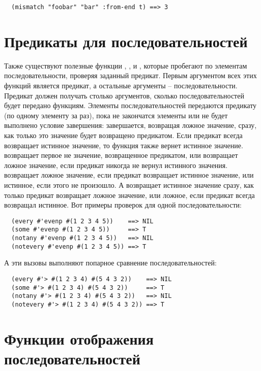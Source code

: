 \begin{verbatim}
  (mismatch "foobar" "bar" :from-end t) ==> 3
\end{verbatim}

\section{Предикаты для последовательностей}

Также существуют полезные функции , ,  и
, которые пробегают по элементам последовательности, проверяя заданный
предикат.  Первым аргументом всех этих функций является предикат, а остальные аргументы --
последовательности.  Предикат должен получать столько аргументов, сколько
последовательностей будет передано функциям.  Элементы последовательностей передаются
предикату (по одному элементу за раз), пока не закончатся элементы или не будет выполнено
условие завершения:  завершается, возвращая ложное значение, сразу, как только это
значение будет возвращено предикатом.  Если предикат всегда возвращает истинное значение,
то функция также вернет истинное значение.   возвращает первое не 
значение, возвращенное предикатом, или возвращает ложное значение, если предикат никогда
не вернул истинного значения.  возвращает ложное значение, если предикат
возвращает истинное значение, или истинное, если этого не произошло.  А 
возвращает истинное значение сразу, как только предикат возвращает ложное значение, или
ложное, если предикат всегда возвращал истинное.  Вот примеры проверок для одной
последовательности:

\begin{verbatim}
  (every #'evenp #(1 2 3 4 5))    ==> NIL
  (some #'evenp #(1 2 3 4 5))     ==> T
  (notany #'evenp #(1 2 3 4 5))   ==> NIL
  (notevery #'evenp #(1 2 3 4 5)) ==> T
\end{verbatim}

А эти вызовы выполняют попарное сравнение последовательностей:

\begin{verbatim}
  (every #'> #(1 2 3 4) #(5 4 3 2))    ==> NIL
  (some #'> #(1 2 3 4) #(5 4 3 2))     ==> T
  (notany #'> #(1 2 3 4) #(5 4 3 2))   ==> NIL
  (notevery #'> #(1 2 3 4) #(5 4 3 2)) ==> T
\end{verbatim}

\section{Функции отображения последовательностей}

